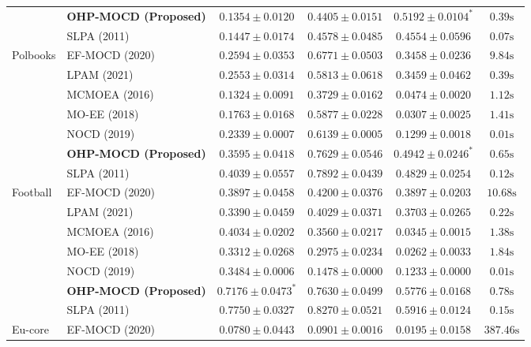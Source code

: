 \documentclass{llncs}
\begin{document}
\begin{table}[t]
{\begin{tabular}{@{}llcccc@{}}
 & \textbf{OHP-MOCD (Proposed)} & $0.1354 \pm 0.0120$ & $0.4405 \pm 0.0151$ & $\mathbf{0.5192 \pm 0.0104^*}$ & $0.39\text{s}$ \\
 & SLPA (2011) & $\mathbf{0.1447 \pm 0.0174}$ & $\mathbf{0.4578 \pm 0.0485}$ & $0.4554 \pm 0.0596$ & $0.07\text{s}$ \\
\midrule
Polbooks & EF-MOCD (2020) & $0.2594 \pm 0.0353$ & $0.6771 \pm 0.0503$ & $0.3458 \pm 0.0236$ & $9.84\text{s}$ \\
 & LPAM (2021) & $0.2553 \pm 0.0314$ & $0.5813 \pm 0.0618$ & $0.3459 \pm 0.0462$ & $0.39\text{s}$ \\
 & MCMOEA (2016) & $0.1324 \pm 0.0091$ & $0.3729 \pm 0.0162$ & $0.0474 \pm 0.0020$ & $1.12\text{s}$ \\
 & MO-EE (2018) & $0.1763 \pm 0.0168$ & $0.5877 \pm 0.0228$ & $0.0307 \pm 0.0025$ & $1.41\text{s}$ \\
 & NOCD (2019) & $0.2339 \pm 0.0007$ & $0.6139 \pm 0.0005$ & $0.1299 \pm 0.0018$ & $0.01\text{s}$ \\
 & \textbf{OHP-MOCD (Proposed)} & $0.3595 \pm 0.0418$ & $0.7629 \pm 0.0546$ & $\mathbf{0.4942 \pm 0.0246^*}$ & $0.65\text{s}$ \\
 & SLPA (2011) & $\mathbf{0.4039 \pm 0.0557}$ & $\mathbf{0.7892 \pm 0.0439}$ & $0.4829 \pm 0.0254$ & $0.12\text{s}$ \\
\midrule
Football & EF-MOCD (2020) & $0.3897 \pm 0.0458$ & $0.4200 \pm 0.0376$ & $0.3897 \pm 0.0203$ & $10.68\text{s}$ \\
 & LPAM (2021) & $0.3390 \pm 0.0459$ & $0.4029 \pm 0.0371$ & $0.3703 \pm 0.0265$ & $0.22\text{s}$ \\
 & MCMOEA (2016) & $0.4034 \pm 0.0202$ & $0.3560 \pm 0.0217$ & $0.0345 \pm 0.0015$ & $1.38\text{s}$ \\
 & MO-EE (2018) & $0.3312 \pm 0.0268$ & $0.2975 \pm 0.0234$ & $0.0262 \pm 0.0033$ & $1.84\text{s}$ \\
 & NOCD (2019) & $0.3484 \pm 0.0006$ & $0.1478 \pm 0.0000$ & $0.1233 \pm 0.0000$ & $0.01\text{s}$ \\
 & \textbf{OHP-MOCD (Proposed)} & $0.7176 \pm 0.0473^*$ & $0.7630 \pm 0.0499$ & $0.5776 \pm 0.0168$ & $0.78\text{s}$ \\
 & SLPA (2011) & $\mathbf{0.7750 \pm 0.0327}$ & $\mathbf{0.8270 \pm 0.0521}$ & $\mathbf{0.5916 \pm 0.0124}$ & $0.15\text{s}$ \\
\midrule
Eu-core & EF-MOCD (2020) & $0.0780 \pm 0.0443$ & $0.0901 \pm 0.0016$ & $0.0195 \pm 0.0158$ & $387.46\text{s}$ \\

\end{tabular}}
\end{table}
\end{document}
